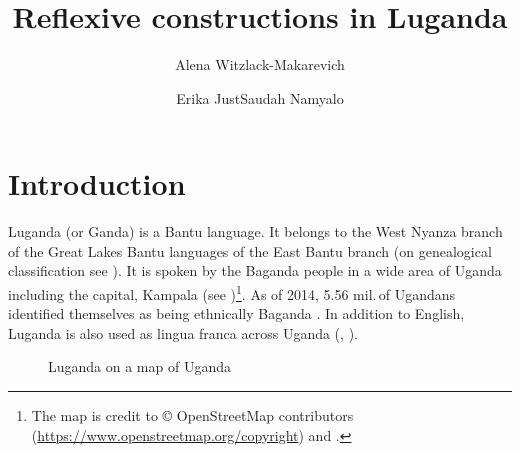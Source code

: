 \documentclass[output=paper,colorlinks,citecolor=brown,
]{langscibook}
\author{Alena Witzlack-Makarevich\affiliation{Hebrew University of Jerusalem}\and Erika Just\affiliation{University of Kiel}\orcid{}\lastand Saudah Namyalo\affiliation{Makerere University}\orcid{}}
\title{Reflexive constructions in Luganda}
\begin{document}
\maketitle

\section{Introduction}\label{sec:Witzlack:1}

Luganda (or Ganda) is a Bantu language. It belongs to the West Nyanza branch of the Great Lakes Bantu languages of the East Bantu branch (on genealogical classification see \citealt{Schoenbrun1994, Schoenbrun1997}). It is spoken by the Baganda people in a wide area of Uganda including the capital, Kampala (see )\footnote{The map is credit to © OpenStreetMap contributors (\url{https://www.openstreetmap.org/copyright}) and \citet{glottolog}.}. 
As of 2014, 5.56 mil.\,of Ugandans identified themselves as being ethnically Baganda \citep{Uganda2016}. In addition to English, Luganda is also used as lingua franca across Uganda (\citealt{IsisngomaEtAl2016}, 
\citealt{Namyalo2016}).

\begin{figure}[!htb]
\begin{center}
  \caption{Luganda on a map of Uganda}\label{fig-map}
\end{center}
\end{figure}
\end{document}
